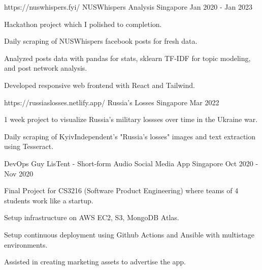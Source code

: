 

\begin{cventries}

  \cventry
    {https://nuswhispers.fyi/} %
    {NUSWhispers Analysis} %
    {Singapore} %
    {Jan 2020 - Jan 2023} %
    {
      \begin{cvitems} %
        \item {Hackathon project which I polished to completion.}
        \item {Daily scraping of NUSWhispers facebook posts for fresh data.}
        \item {Analyzed posts data with pandas for stats, sklearn TF-IDF for topic modeling, and post network analysis.}
        \item {Developed responsive web frontend with React and Tailwind.}
      \end{cvitems}
    }

  \cventry
    {https://russiaslosses.netlify.app/} %
    {Russia's Losses} %
    {Singapore} %
    {Mar 2022} %
    {
      \begin{cvitems} %
        \item {1 week project to visualize Russia's military lossses over time in the Ukraine war.}
        \item {Daily scraping of KyivIndependent's "Russia's losses" images and text extraction using Tesseract.}
      \end{cvitems}
    }

  \cventry
    {DevOps Guy} %
    {LisTent - Short-form Audio Social Media App} %
    {Singapore} %
    {Oct 2020 - Nov 2020} %
    {
      \begin{cvitems} %
        \item {Final Project for CS3216 (Software Product Engineering) where teams of 4 students work like a startup.}
        \item {Setup infrastructure on AWS EC2, S3, MongoDB Atlas.}
        \item {Setup continuous deployment using Github Actions and Ansible with multistage environments.}
        \item {Assisted in creating marketing assets to advertise the app.}
      \end{cvitems}
    }


\end{cventries}

